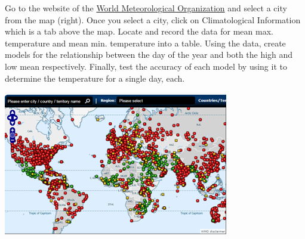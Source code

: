 \documentclass[12pt]{book}
\begin{document}
\begin{enumerate}
\begin{minipage}{4in}
\item Go to the website of the \href{http://worldweather.wmo.int/}{World Meteorological Organization} and select a city from the map (right).
Once you select a city, click on Climatological Information which is a tab above the map. Locate and record the data for mean max. temperature and mean min. temperature into a table. Using the data, create models for the relationship between the day of the year and both the high and low mean respectively. Finally, test the accuracy of each model by using it to determine the temperature for a single day, each.
\end{minipage}\hspace{0.2in}
\begin{minipage}{1in}
\includegraphics[scale=0.75]{WorldMap.png}
\end{minipage}

\newpage


\end{enumerate}
\end{document}

